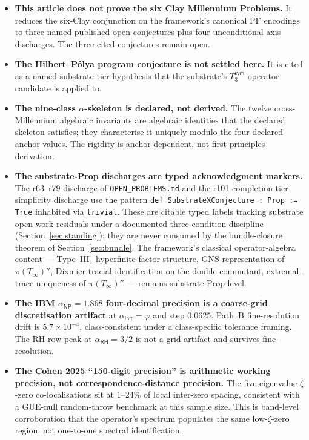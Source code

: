 \documentclass[11pt,a4paper]{amsart}
\theoremstyle{plain}
\theoremstyle{definition}
\begin{document}
\begin{itemize}[itemsep=4pt]
\item \textbf{This article does not prove the six Clay Millennium Problems.} It reduces the six-Clay conjunction on the framework's canonical PF encodings to three named published open conjectures plus four unconditional axis discharges. The three cited conjectures remain open.
\item \textbf{The Hilbert--P\'olya program conjecture is not settled here.} It is cited as a named substrate-tier hypothesis that the substrate's $T_3^{\textsf{sym}}$ operator candidate is applied to.
\item \textbf{The nine-class $\alpha$-skeleton is declared, not derived.} The twelve cross-Millennium algebraic invariants are algebraic identities that the declared skeleton satisfies; they characterise it uniquely modulo the four declared anchor values. The rigidity is anchor-dependent, not first-principles derivation.
\item \textbf{The substrate-Prop discharges are typed acknowledgment markers.} The r63--r79 discharge of \texttt{OPEN\_PROBLEMS.md} and the r101 completion-tier simplicity discharge use the pattern \texttt{def SubstrateXConjecture : Prop := True} inhabited via \texttt{trivial}. These are citable typed labels tracking substrate open-work residuals under a documented three-condition discipline (Section~\ref{sec:standing}); they are never consumed by the bundle-closure theorem of Section~\ref{sec:bundle}. The framework's classical operator-algebra content --- Type~III$_1$ hyperfinite-factor structure, GNS representation of $\pi(T_\infty)''$, Dixmier tracial identification on the double commutant, extremal-trace uniqueness of $\pi(T_\infty)''$ --- remains substrate-Prop-level.
\item \textbf{The IBM $\alpha_{\textsf{NP}} = 1.868$ four-decimal precision is a coarse-grid discretisation artifact} at $\alpha_{\textsf{init}} = \varphi$ and step $0.0625$. Path~B fine-resolution drift is $5.7 \times 10^{-4}$, class-consistent under a class-specific tolerance framing. The RH-row peak at $\alpha_{\textsf{RH}} = 3/2$ is not a grid artifact and survives fine-resolution.
\item \textbf{The Cohen 2025 ``150-digit precision'' is arithmetic working precision, not correspondence-distance precision.} The five eigenvalue-$\zeta$-zero co-localisations sit at $1$--$24\%$ of local inter-zero spacing, consistent with a GUE-null random-throw benchmark at this sample size. This is band-level corroboration that the operator's spectrum populates the same low-$\zeta$-zero region, not one-to-one spectral identification.
\end{itemize}
\end{document}
